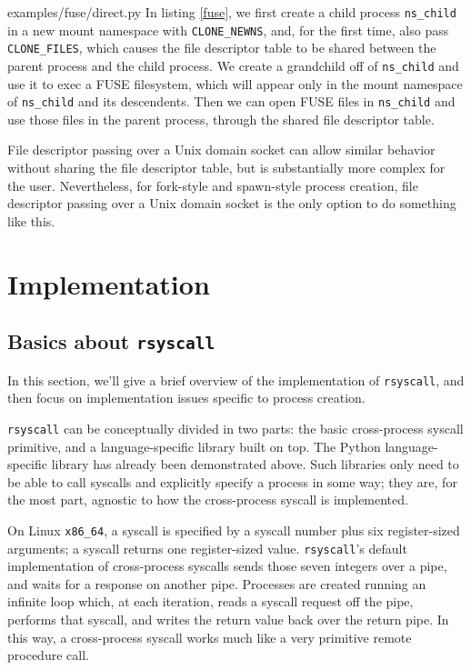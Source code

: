 \documentclass[sigplan]{acmart}
\begin{document}

{examples/fuse/direct.py}
In listing \ref{fuse},
we first create a child process \verb|ns_child| in a new mount namespace with \verb|CLONE_NEWNS|,
and, for the first time, also pass \verb|CLONE_FILES|,
which causes the file descriptor table to be shared between the parent process and the child process.
We create a grandchild off of \verb|ns_child|
and use it to exec a FUSE filesystem,
which will appear only in the mount namespace of \verb|ns_child| and its descendents.
Then we can open FUSE files in \verb|ns_child|
and use those files in the parent process,
through the shared file descriptor table.

File descriptor passing over a Unix domain socket
can allow similar behavior without sharing the file descriptor table,
but is substantially more complex for the user.
Nevertheless, for fork-style and spawn-style process creation,
file descriptor passing over a Unix domain socket
is the only option to do something like this.
\section{Implementation}\label{implementation}
\subsection{Basics about \texttt{rsyscall}}
In this section, we'll give a brief overview of the implementation of \texttt{rsyscall},
and then focus on implementation issues specific to process creation.

\texttt{rsyscall} can be conceptually divided in two parts:
the basic cross-process syscall primitive,
and a language-specific library built on top.
The Python language-specific library has already been demonstrated above.
Such libraries only need to be able to call syscalls and explicitly specify a process in some way;
they are, for the most part, agnostic to how the cross-process syscall is implemented.

On Linux \verb|x86_64|, a syscall is specified by a syscall number plus six register-sized arguments;
a syscall returns one register-sized value.
\texttt{rsyscall}'s default implementation of cross-process syscalls sends those seven integers over a pipe,
and waits for a response on another pipe.
Processes are created running an infinite loop which, at each iteration,
reads a syscall request off the pipe,
performs that syscall,
and writes the return value back over the return pipe.
In this way, a cross-process syscall works much like a very primitive remote procedure call.
\end{document}

